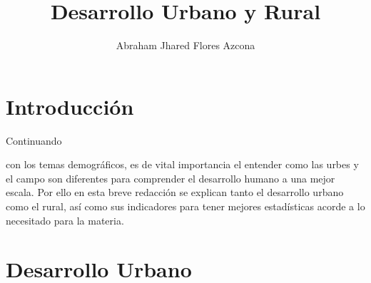 \documentclass[stu, 12pt, letterpaper, donotrepeattitle, floatsintext, natbib]{apa7}
\title{\Large Desarrollo Urbano y Rural}
\author{Abraham Jhared Flores Azcona} %
\affiliation{Instituto Tecnológico de Tijuana}
\begin{document}
\maketitle


\renewcommand\contentsname{Contenido}
\tableofcontents

\newpage
\section*{Introducción}
Continuando \begin{justifying}
    con los temas demográficos, es de vital importancia el entender como las urbes y el campo son diferentes para comprender el desarrollo humano
    a una mejor escala. Por ello en esta breve redacción se explican tanto el desarrollo urbano como el rural, así como sus indicadores para tener mejores
    estadísticas acorde a lo necesitado para la materia.\par
\end{justifying}
\vspace{\baselineskip}
\section{Desarrollo Urbano}
\end{document}
